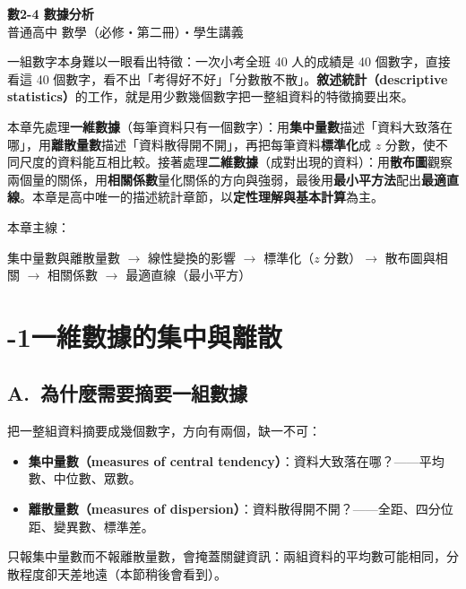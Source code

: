 \documentclass[11pt]{article}
\begin{document}
\begin{center}
{\sffamily\Huge\bfseries 數2-4 數據分析}\\[3pt]
{\sffamily\large 普通高中 數學（必修・第二冊）・學生講義}
\end{center}
\vspace{0.6em}

一組數字本身難以一眼看出特徵：一次小考全班 40 人的成績是 40 個數字，直接看這 40 個數字，看不出「考得好不好」「分數散不散」。\textbf{敘述統計（descriptive statistics）}的工作，就是用少數幾個數字把一整組資料的特徵摘要出來。

本章先處理\textbf{一維數據}（每筆資料只有一個數字）：用\textbf{集中量數}描述「資料大致落在哪」，用\textbf{離散量數}描述「資料散得開不開」，再把每筆資料\textbf{標準化}成 $z$ 分數，使不同尺度的資料能互相比較。接著處理\textbf{二維數據}（成對出現的資料）：用\textbf{散布圖}觀察兩個量的關係，用\textbf{相關係數}量化關係的方向與強弱，最後用\textbf{最小平方法}配出\textbf{最適直線}。本章是高中唯一的描述統計章節，以\textbf{定性理解與基本計算}為主。

\medskip
本章主線：

\begin{center}
集中量數與離散量數 $\rightarrow$ 線性變換的影響 $\rightarrow$ 標準化（$z$ 分數）$\rightarrow$ 散布圖與相關 $\rightarrow$ 相關係數 $\rightarrow$ 最適直線（最小平方）
\end{center}

\section*{-1\quad 一維數據的集中與離散}

\subsection*{\sffamily A.\ 為什麼需要摘要一組數據}

把一整組資料摘要成幾個數字，方向有兩個，缺一不可：

\begin{itemize}\setlength{\itemsep}{2pt}
\item \textbf{集中量數（measures of central tendency）}：資料大致落在哪？——平均數、中位數、眾數。
\item \textbf{離散量數（measures of dispersion）}：資料散得開不開？——全距、四分位距、變異數、標準差。
\end{itemize}

只報集中量數而不報離散量數，會掩蓋關鍵資訊：兩組資料的平均數可能相同，分散程度卻天差地遠（本節稍後會看到）。
\end{document}
